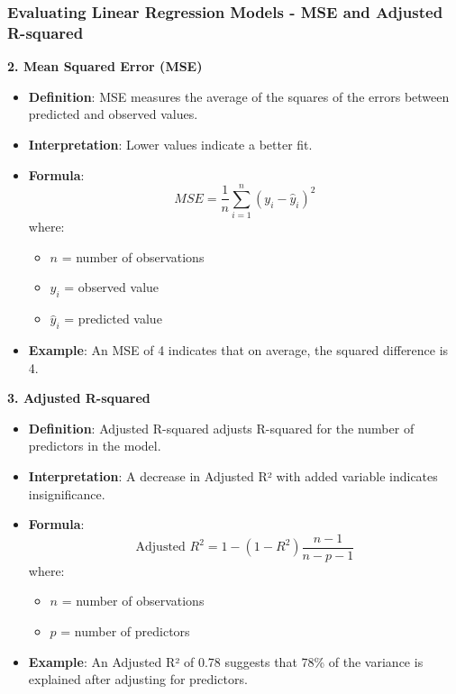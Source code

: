 \documentclass[aspectratio=169]{beamer}
\begin{document}
\begin{frame}[fragile]
    \frametitle{Evaluating Linear Regression Models - MSE and Adjusted R-squared}
    \textbf{2. Mean Squared Error (MSE)} \\
    \begin{itemize}
        \item \textbf{Definition}: MSE measures the average of the squares of the errors between predicted and observed values.
        \item \textbf{Interpretation}: Lower values indicate a better fit.
        \item \textbf{Formula}:
            \begin{equation}
                MSE = \frac{1}{n} \sum_{i=1}^{n} (y_i - \hat{y}_i)^2
            \end{equation}
            where:
            \begin{itemize}
                \item \(n\) = number of observations
                \item \(y_i\) = observed value
                \item \(\hat{y}_i\) = predicted value
            \end{itemize}
        \item \textbf{Example}: An MSE of 4 indicates that on average, the squared difference is 4.
    \end{itemize}
    
    \textbf{3. Adjusted R-squared} \\
    \begin{itemize}
        \item \textbf{Definition}: Adjusted R-squared adjusts R-squared for the number of predictors in the model.
        \item \textbf{Interpretation}: A decrease in Adjusted R² with added variable indicates insignificance.
        \item \textbf{Formula}:
            \begin{equation}
                \text{Adjusted } R^2 = 1 - \left(1 - R^2\right) \frac{n - 1}{n - p - 1}
            \end{equation}
            where:
            \begin{itemize}
                \item \(n\) = number of observations
                \item \(p\) = number of predictors
            \end{itemize}
        \item \textbf{Example}: An Adjusted R² of 0.78 suggests that 78\% of the variance is explained after adjusting for predictors.
    \end{itemize}
\end{frame}
\end{document}
